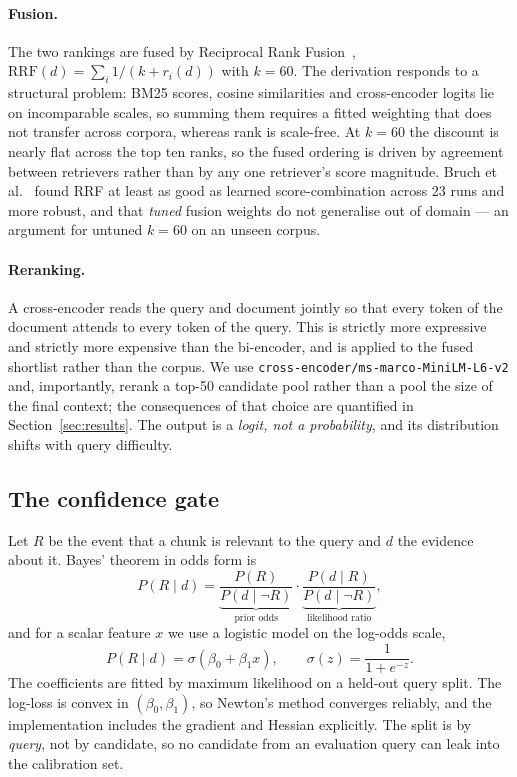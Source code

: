 \documentclass[preprint,3p,times]{elsarticle}
\begin{document}
\paragraph{Fusion.} The two rankings are fused by Reciprocal Rank
Fusion~\cite{cormack2009rrf}, $\mathrm{RRF}(d)=\sum_i 1/(k+r_i(d))$ with
$k=60$. The derivation responds to a structural problem: BM25 scores, cosine
similarities and cross-encoder logits lie on incomparable scales, so summing
them requires a fitted weighting that does not transfer across corpora, whereas
rank is scale-free. At $k=60$ the discount is nearly flat across the top ten
ranks, so the fused ordering is driven by agreement between retrievers rather
than by any one retriever's score magnitude.
Bruch et al.~\cite{bruch2023fusion} found RRF at least as good as learned
score-combination across 23 runs and more robust, and that \emph{tuned} fusion
weights do not generalise out of domain --- an argument for untuned $k=60$ on
an unseen corpus.

\paragraph{Reranking.} A cross-encoder reads the query and document jointly so
that every token of the document attends to every token of the query. This is
strictly more expressive and strictly more expensive than the bi-encoder, and
is applied to the fused shortlist rather than the corpus. We use
\texttt{cross-encoder/ms-marco-MiniLM-L6-v2} and, importantly, rerank a
top-50 candidate pool rather than a pool the size of the final context; the
consequences of that choice are quantified in Section~\ref{sec:results}. The
output is a \emph{logit, not a probability}, and its distribution shifts with
query difficulty.

\subsection{The confidence gate}

Let $R$ be the event that a chunk is relevant to the query and $d$ the evidence
about it. Bayes' theorem in odds form is
\begin{equation}
P(R\mid d)=\underbrace{\frac{P(R)}{P(d\mid\neg R)}}_{\text{prior odds}}
\cdot\underbrace{\frac{P(d\mid R)}{P(d\mid\neg R)}}_{\text{likelihood ratio}},
\end{equation}
and for a scalar feature $x$ we use a logistic model on the log-odds scale,
\begin{equation}
P(R\mid d)=\sigma(\beta_0+\beta_1 x),\qquad
\sigma(z)=\frac{1}{1+e^{-z}}.
\end{equation}
The coefficients are fitted by maximum likelihood on a held-out query split.
The log-loss is convex in $(\beta_0,\beta_1)$, so Newton's method converges
reliably, and the implementation includes the gradient and Hessian explicitly.
The split is by \emph{query}, not by candidate, so no candidate from an
evaluation query can leak into the calibration set.
\end{document}
